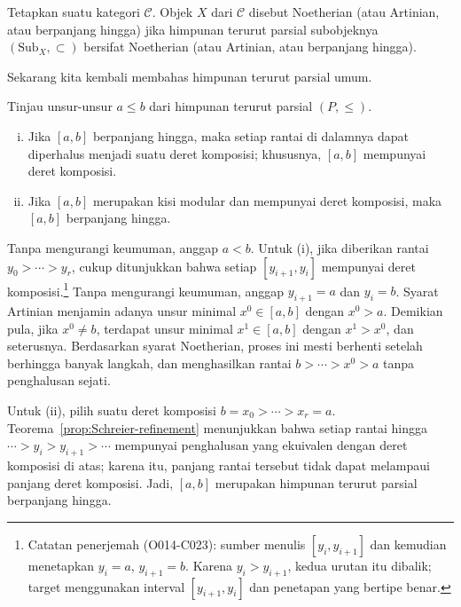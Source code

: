 \begin{definisi}\label{def:finite-length-object}
	Tetapkan suatu kategori $\mathcal{C}$. Objek $X$ dari $\mathcal{C}$ disebut
	Noetherian (atau Artinian, atau berpanjang hingga) jika himpunan terurut
	parsial subobjeknya $(\mathrm{Sub}_X,\subset)$ bersifat Noetherian (atau
	Artinian, atau berpanjang hingga).
\end{definisi}

Sekarang kita kembali membahas himpunan terurut parsial umum.

\begin{lema}\label{prop:lattice-composition-series}
	Tinjau unsur-unsur $a \leq b$ dari himpunan terurut parsial $(P,\leq)$.
	\begin{enumerate}[(i)]
		\item Jika $[a,b]$ berpanjang hingga, maka setiap rantai di dalamnya dapat
		diperhalus menjadi suatu deret komposisi; khususnya, $[a,b]$ mempunyai
		deret komposisi.
		\item Jika $[a,b]$ merupakan kisi modular dan mempunyai deret
		komposisi, maka $[a,b]$ berpanjang hingga.
	\end{enumerate}
\end{lema}
\begin{bukti}
	Tanpa mengurangi keumuman, anggap $a<b$. Untuk (i), jika diberikan rantai
	$y_0>\cdots>y_r$, cukup ditunjukkan bahwa setiap $[y_{i+1},y_i]$ mempunyai
	deret komposisi.\footnote{Catatan penerjemah (O014-C023): sumber menulis
	$[y_i,y_{i+1}]$ dan kemudian menetapkan $y_i=a$, $y_{i+1}=b$. Karena
	$y_i>y_{i+1}$, kedua urutan itu dibalik; target menggunakan interval
	$[y_{i+1},y_i]$ dan penetapan yang bertipe benar.} Tanpa mengurangi
	keumuman, anggap $y_{i+1}=a$ dan $y_i=b$. Syarat Artinian menjamin adanya
	unsur minimal
	$x^0 \in [a,b]$ dengan $x^0>a$. Demikian pula, jika $x^0 \neq b$, terdapat
	unsur minimal $x^1 \in [a,b]$ dengan $x^1>x^0$, dan seterusnya. Berdasarkan
	syarat Noetherian, proses ini mesti berhenti setelah berhingga banyak langkah,
	dan menghasilkan rantai $b>\cdots>x^0>a$ tanpa penghalusan sejati.

	Untuk (ii), pilih suatu deret komposisi $b=x_0>\cdots>x_r=a$.
	Teorema~\ref{prop:Schreier-refinement} menunjukkan bahwa setiap rantai
	hingga $\cdots>y_i>y_{i+1}>\cdots$ mempunyai penghalusan yang
	ekuivalen dengan deret komposisi di atas; karena itu, panjang rantai tersebut
	tidak dapat melampaui panjang deret komposisi. Jadi, $[a,b]$ merupakan
	himpunan terurut parsial berpanjang hingga.
\end{bukti}

